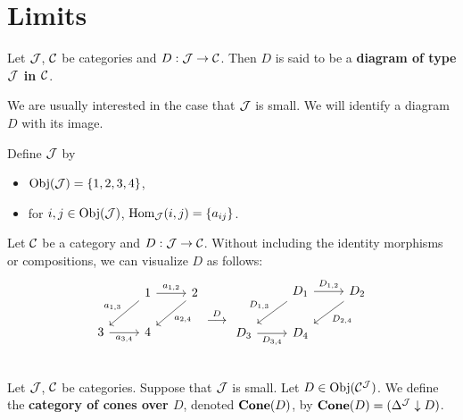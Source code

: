 \documentclass{book}
\begin{document}
	
	
	\newpage
	\section{Limits}
	
	\begin{defn}
		Let $\mathcal{J}$, $\mathcal{C}$ be categories and $D: \mathcal{J} \rightarrow \mathcal{C}$. Then $D$ is said to be a \textbf{diagram of type $\mathcal{J}$ in $\mathcal{C}$}.
	\end{defn}

	\begin{note}
		We are usually interested in the case that $\mathcal{J}$ is small. We will identify a diagram $D$ with its image. 
	\end{note}

	\begin{exmp}
		Define $\mathcal{J}$ by
		\begin{itemize}
			\item  $\operatorname{Obj}(\mathcal{J}) = \{1, 2, 3, 4\}$,
			\item for $i,j \in \operatorname{Obj}(\mathcal{J})$, $\operatorname{Hom}_{\mathcal{J}}(i,j) = \{a_{ij}\}$.
		\end{itemize}
		Let $\mathcal{C}$ be a category and $D: \mathcal{J} \rightarrow \mathcal{C}$. Without including the identity morphisms or compositions, we can visualize $D$ as follows:
		\[
		\begin{tikzcd}
			&     1  \arrow[dl, "a_{1,3}"'] \arrow[r, "a_{1,2}"]        &  2 \arrow[dl, "a_{2,4}"] \\
			3 \arrow[r, "a_{3,4}"'] &        4   & \\
		\end{tikzcd}
		\overset{D}{\longrightarrow}
		\begin{tikzcd}
			&     D_1  \arrow[dl, "D_{1,3}"'] \arrow[r, "D_{1,2}"]        &  D_2 \arrow[dl, "D_{2,4}"] \\
			D_3 \arrow[r, "D_{3, 4}"'] &        D_4   & \\
		\end{tikzcd}
		\]
	\end{exmp}

	\begin{defn}
		Let $\mathcal{J}$, $\mathcal{C}$ be categories. Suppose that $\mathcal{J}$ is small. Let $D \in \operatorname{Obj}(\mathcal{C}^{\mathcal{J}})$. We define the \textbf{category of cones over $D$}, denoted $\operatorname*{\text{\textbf{Cone}}}(D)$, by $\operatorname*{\text{\textbf{Cone}}}(D) = (\Delta^{\mathcal{J}} \downarrow D)$.
	\end{defn}
\end{document}
